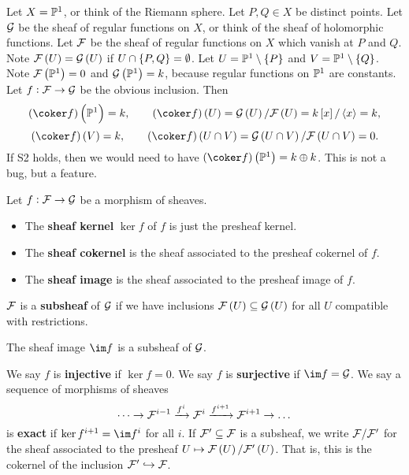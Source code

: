 \begin{example*}
Let $ X = \mathbb{P}^1 $, or think of the Riemann sphere. Let $ P, Q \in X $ be distinct points. Let $ \mathcal{G} $ be the sheaf of regular functions on $ X $, or think of the sheaf of holomorphic functions. Let $ \mathcal{F} $ be the sheaf of regular functions on $ X $ which vanish at $ P $ and $ Q $. Note $ \FFF\br{U} = \GGG\br{U} $ if $ U \cap \cbr{P, Q} = \emptyset $. Let $ U = \PP^1 \setminus \cbr{P} $ and $ V = \PP^1 \setminus \cbr{Q} $. Note $ \FFF\br{\PP^1} = 0 $ and $ \GGG\br{\PP^1} = k $, because regular functions on $ \mathbb{P}^1 $ are constants. Let $ f : \mathcal{F} \to \mathcal{G} $ be the obvious inclusion. Then
$$ \br{\coker f}\br{\PP^1} = k, \qquad \br{\coker f}\br{U} = \GGG\br{U} / \FFF\br{U} = k\sbr{x} / \abr{x} = k, $$
$$ \br{\coker f}\br{V} = k, \qquad \br{\coker f}\br{U \cap V} = \GGG\br{U \cap V} / \FFF\br{U \cap V} = 0. $$
If S2 holds, then we would need to have $ \br{\coker f}\br{\PP^1} = k \oplus k $. This is not a bug, but a feature.
\end{example*}

\begin{definition*}
Let $ f : \mathcal{F} \to \mathcal{G} $ be a morphism of sheaves.
\begin{itemize}
\item The \textbf{sheaf kernel} $ \ker f $ of $ f $ is just the presheaf kernel.
\item The \textbf{sheaf cokernel} is the sheaf associated to the presheaf cokernel of $ f $.
\item The \textbf{sheaf image} is the sheaf associated to the presheaf image of $ f $.
\end{itemize}
$ \mathcal{F} $ is a \textbf{subsheaf} of $ \mathcal{G} $ if we have inclusions $ \FFF\br{U} \subseteq \GGG\br{U} $ for all $ U $ compatible with restrictions.
\end{definition*}

\begin{exercise*}
The sheaf image $ \im f $ is a subsheaf of $ \mathcal{G} $.
\end{exercise*}

\begin{definition*}
We say $ f $ is \textbf{injective} if $ \ker f = 0 $. We say $ f $ is \textbf{surjective} if $ \im f = \GGG $. We say a sequence of morphisms of sheaves
$$ \dots \to \mathcal{F}^{i - 1} \xrightarrow{f^i} \mathcal{F}^i \xrightarrow{f^{i + 1}} \mathcal{F}^{i + 1} \to \dots $$
is \textbf{exact} if $ \ker f^{i + 1} = \im f^i $ for all $ i $. If $ \mathcal{F}' \subseteq \mathcal{F} $ is a subsheaf, we write $ \mathcal{F} / \mathcal{F}' $ for the sheaf associated to the presheaf $ U \mapsto \FFF\br{U} / \FFF'\br{U} $. That is, this is the cokernel of the inclusion $ \mathcal{F}' \hookrightarrow \mathcal{F} $.
\end{definition*}

